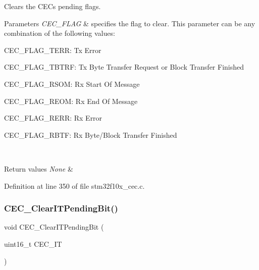 Clears the C\+EC\textquotesingle{}s pending flags. 


\begin{DoxyParams}{Parameters}
{\em C\+E\+C\+\_\+\+F\+L\+AG} & specifies the flag to clear. This parameter can be any combination of the following values\+: \begin{DoxyItemize}
\item C\+E\+C\+\_\+\+F\+L\+A\+G\+\_\+\+T\+E\+RR\+: Tx Error \item C\+E\+C\+\_\+\+F\+L\+A\+G\+\_\+\+T\+B\+T\+RF\+: Tx Byte Transfer Request or Block Transfer Finished \item C\+E\+C\+\_\+\+F\+L\+A\+G\+\_\+\+R\+S\+OM\+: Rx Start Of Message \item C\+E\+C\+\_\+\+F\+L\+A\+G\+\_\+\+R\+E\+OM\+: Rx End Of Message \item C\+E\+C\+\_\+\+F\+L\+A\+G\+\_\+\+R\+E\+RR\+: Rx Error \item C\+E\+C\+\_\+\+F\+L\+A\+G\+\_\+\+R\+B\+TF\+: Rx Byte/\+Block Transfer Finished \end{DoxyItemize}
\\
\hline
\end{DoxyParams}

\begin{DoxyRetVals}{Return values}
{\em None} & \\
\hline
\end{DoxyRetVals}


Definition at line 350 of file stm32f10x\+\_\+cec.\+c.

\mbox{\label{group___c_e_c___private___functions_gade646921262a077172c708953822f248}} 
\subsubsection{\texorpdfstring{C\+E\+C\+\_\+\+Clear\+I\+T\+Pending\+Bit()}{CEC\_ClearITPendingBit()}}
{\footnotesize\ttfamily void C\+E\+C\+\_\+\+Clear\+I\+T\+Pending\+Bit (\begin{DoxyParamCaption}\item[{uint16\+\_\+t}]{C\+E\+C\+\_\+\+IT }\end{DoxyParamCaption})}



